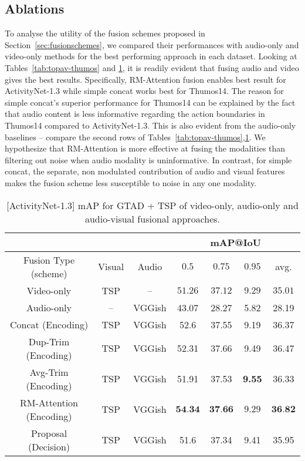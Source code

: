 \documentclass[10pt,twocolumn,letterpaper]{article}
\begin{document}
\subsection{Ablations}

To analyse the utility of the fusion schemes proposed in Section~\ref{sec:fusionschemes}, we compared their performances with audio-only  and video-only methods for the best performing approach in each dataset. Looking at Tables~\ref{tab:topav-thumos} and \ref{tab:topav-anet}, it is readily evident that fusing audio and video gives the best results. Specifically, RM-Attention fusion enables best result for ActivityNet-1.3 while simple concat works best for Thumos14. The reason for simple concat's superior performance for Thumos14 can be explained by the fact that audio content is less informative regarding the action boundaries in Thumos14 compared to ActivityNet-1.3. This is also evident from the audio-only baselines -- compare the second rows of Tables~\ref{tab:topav-thumos},\ref{tab:topav-anet}. We hypothesize that RM-Attention is more effective at fusing the modalities than filtering out noise when audio modality is uninformative.  In contrast, for simple concat, the separate, non modulated contribution of audio and visual features makes the fusion scheme less susceptible to noise in any one modality. 

\begin{table}[!t]
\centering
\resizebox{\linewidth}{!}
{
\centering
\begin{tabular}{c|c|c|c|c|c|c}
       & &  & \multicolumn{4}{c}{mAP@IoU} \\
\toprule

 Fusion Type (scheme) & Visual  & Audio & $\mathbf{0.5}$ & $0.75$ & $0.95$ & avg. \\
\toprule
  Video-only & TSP & -- & $51.26$ & $37.12$ & $9.29$ & $35.01$ \\ 
  \midrule
  Audio-only & -- & VGGish & 43.07 & 28.27 & 5.82 &  28.19 \\
   \midrule
   Concat (Encoding) & TSP & VGGish & 52.6 & 37.55 & 9.19 & 36.37 \\
   \midrule
   Dup-Trim (Encoding) & TSP & VGGish & 52.31 & 37.66 & 9.49 & 36.47 \\
   \midrule
   Avg-Trim (Encoding) & TSP & VGGish & 51.91 & 37.53 & \textbf{9.55} & 36.33 \\
   \midrule
  RM-Attention (Encoding) & TSP & VGGish & $\textbf{54.34}$ & $\textbf{37.66}$ & $9.29$ & $\textbf{36.82}$  \\
 \midrule
   Proposal (Decision) & TSP & VGGish &  51.6	& 37.34	& 9.41 & 35.95   \\
 \bottomrule
\end{tabular}
}
\caption{[ActivityNet-1.3] mAP for GTAD\cite{Xu_2020_CVPR} + TSP\cite{DBLP:journals/corr/abs-2011-11479} of video-only, audio-only and audio-visual fusional approaches.}
\label{tab:topav-anet}
\end{table}
\end{document}
